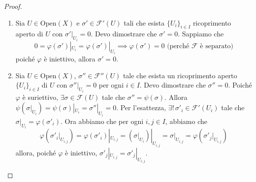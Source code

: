 \begin{proof}{}
\begin{enumerate}[label = \arabic*)]
    \item Sia \(U \in \mathrm{Open}{(X)}\) e \(\sigma' \in \mathcal{F}'{(U)}\)
        tali che esista \(\{U_{i}\}_{i \in I}  \) ricoprimento aperto di \(U\)
        con \(\sigma'|_{U_{i}} = 0\). Devo dimostrare che \(\sigma' = 0\).
        Sappiamo che 
        \[
            0 = \varphi {(\sigma')}|_{U_{i}}  = \varphi {(\sigma')}|_{U_{i}}
          \implies \varphi {(\sigma')} = 0 \text{ (perché \(\mathcal{F}\) è
          separato)}
        \]
        poiché \(\varphi \) è iniettivo, allora \(\sigma' = 0\).
    \item Sia \(U \in \mathrm{Open}{(X)}\), \(\sigma'' \in \mathcal{F}''{(U)}\)
        tale che esista un ricoprimento aperto \(\{U_{i}\} _{i \in I} \) di
        \(U\) con \(\sigma''|_{U_{i}} = 0\) per ogni \(i \in I\). Devo
        dimostrare che \(\sigma'' = 0\). Poiché \(\varphi \) è suriettivo,
        \(\exists \sigma \in \mathcal{F}{(U)}\) tale che \(\sigma'' = \psi
        {(\sigma)}\). Allora \(\psi{(\sigma|_{U_{i}})} = \psi{(\sigma)}|_{U_{i}}
        = \sigma''|_{U_{i}} = 0\). Per l'esattezza, \(\exists !\, \sigma'_i \in
        \mathcal{F}'{(U_{i})}\) tale che \(\sigma|_{U_{i}}  = \varphi
        {(\sigma'_i)}\). 
        Ora abbiamo che per ogni \(i, j \in I\), abbiamo che
        \[
          \varphi {(\sigma'_i|_{U_{i, j} })} = \varphi {(\sigma'_i)}|_{U_{i,j}}
          = {(\sigma|_{U_{i}} )}|_{U_{i,j}} = \sigma|_{U_{i,j}} = \varphi
          {(\sigma'_j|_{U_{i,j}} )}
        \]
        allora, poiché \(\varphi \) è iniettivo, \(\sigma'_j|_{U_{i,j}} =
        \sigma'_j|_{U_{i,j}}\).


\end{enumerate}
\end{proof}
